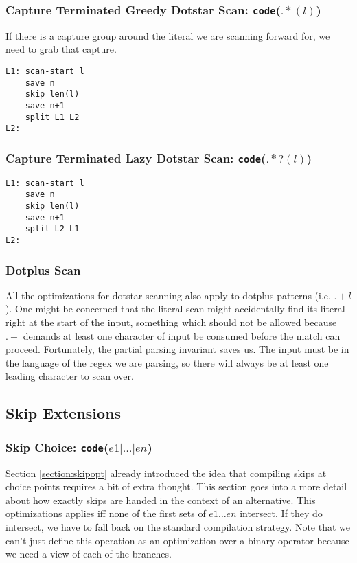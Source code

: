 \subsubsection{Capture Terminated Greedy Dotstar Scan: {\tt code}($.*(l)$)}
  \label{capterm}

If there is a capture group around the literal we are scanning forward
for, we need to grab that capture.

\begin{verbatim}
L1: scan-start l
    save n
    skip len(l)
    save n+1
    split L1 L2
L2: 
\end{verbatim}

\subsubsection{Capture Terminated Lazy Dotstar Scan: {\tt code}($.*?(l)$)}

\begin{verbatim}
L1: scan-start l
    save n
    skip len(l)
    save n+1
    split L2 L1
L2: 
\end{verbatim}

\subsubsection{Dotplus Scan}

All the optimizations for dotstar scanning also apply to dotplus
patterns (i.e. $.+l$). One might be concerned that the literal scan
might accidentally find its literal right at the start of the input,
something which should not be allowed because $.+$ demands at least
one character of input be consumed before the match can proceed.
Fortunately, the partial parsing invariant saves us. The input must
be in the language of the regex we are parsing, so there will always
be at least one leading character to scan over.

\subsection{Skip Extensions}

\subsubsection{Skip Choice: {\tt code}($e1 \rvert \dots \rvert en$)}

Section \ref{section:skipopt} already introduced the idea that
compiling skips at choice points requires a bit of extra thought.
This section goes into a more detail about how exactly skips are
handed in the context of an alternative.
This optimizations applies iff none of the first sets of $e1 \dots en$
intersect. If they do intersect, we have to fall back on the standard
compilation strategy. Note that we can't just define this operation as
an optimization over a binary operator because we need a view of each
of the branches.


